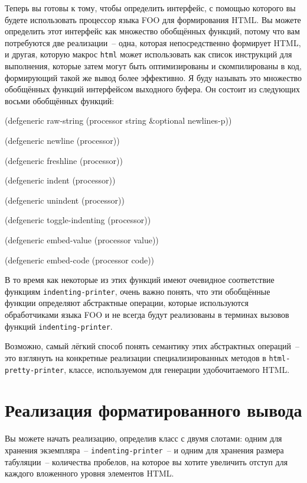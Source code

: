 Теперь вы готовы к тому, чтобы определить интерфейс, с помощью которого вы будете
использовать процессор языка FOO для формирования HTML. Вы можете определить этот
интерфейс как множество обобщённых функций, потому что вам потребуются две реализации~--
одна, которая непосредственно формирует HTML, и другая, которую макрос \lstinline{html} может
использовать как список инструкций для выполнения, которые затем могут быть оптимизированы
и скомпилированы в код, формирующий такой же вывод более эффективно. Я буду называть это
множество обобщённых функций интерфейсом выходного буфера. Он состоит из следующих восьми
обобщённых функций:

\begin{myverb}
(defgeneric raw-string (processor string &optional newlines-p))

(defgeneric newline (processor))

(defgeneric freshline (processor))

(defgeneric indent (processor))

(defgeneric unindent (processor))

(defgeneric toggle-indenting (processor))

(defgeneric embed-value (processor value))

(defgeneric embed-code (processor code))
\end{myverb}

В то время как некоторые из этих функций имеют очевидное соответствие функциям
\lstinline{indenting-printer}, очень важно понять, что эти обобщённые функции определяют
абстрактные операции, которые используются обработчиками языка FOO и не всегда будут
реализованы в терминах вызовов функций \lstinline{indenting-printer}.

Возможно, самый лёгкий способ понять семантику этих абстрактных операций~-- это взглянуть на
конкретные реализации специализированных методов в \lstinline{html-pretty-printer}, классе,
используемом для генерации удобочитаемого HTML.

\section{Реализация форматированного вывода}

Вы можете начать реализацию, определив класс с двумя слотами: одним для хранения
экземпляра~-- \lstinline{indenting-printer}~-- и одним для хранения размера табуляции~--
количества пробелов, на которое вы хотите увеличить отступ для каждого вложенного уровня
элементов HTML.

